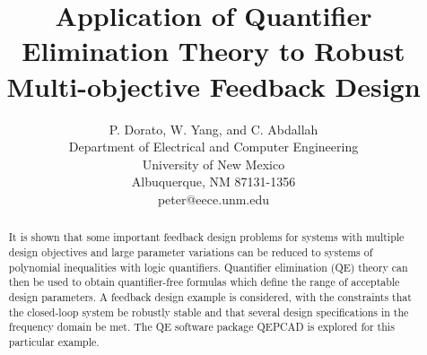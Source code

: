 \title{Application of Quantifier Elimination Theory to
Robust Multi-objective Feedback
Design}
\author{P. Dorato, W. Yang, and C. Abdallah\\
Department of Electrical and Computer Engineering\\
University of New Mexico\\
Albuquerque, NM 87131-1356\\
peter@eece.unm.edu}
\date{}

\maketitle
\begin{abstract}
It is shown that some important feedback design problems
for systems with multiple design objectives and large
parameter variations can be reduced to
systems of polynomial inequalities with logic quantifiers. 
Quantifier elimination (QE) theory can then be used to obtain
quantifier-free formulas which define the range of acceptable
design parameters. A feedback design example is considered, with
the constraints that the closed-loop system be robustly stable and that
several design specifications in the frequency domain be met. The
QE software package QEPCAD is explored for this particular example.
 
\end{abstract}



